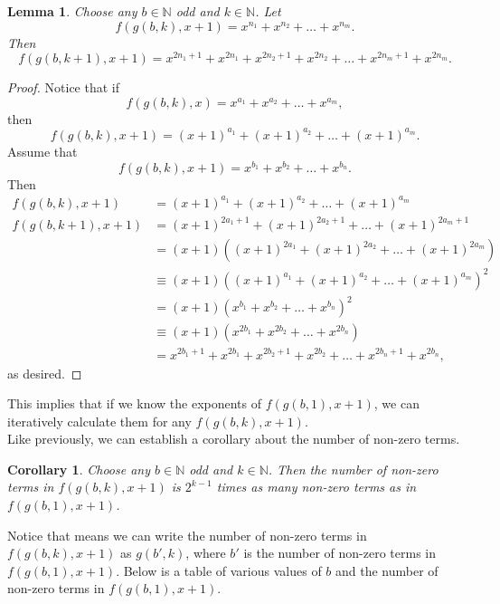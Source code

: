 \documentclass{article}
\newtheorem{lemma}{Lemma}
\newtheorem{corollary}{Corollary}
\newcommand{\N}{\mathbb{N}}
\begin{document}
	\newpage
	\begin{lemma}
		Choose any $b \in \N$ odd and $k \in \N$.
		Let
		\begin{equation*}
			f(g(b,k),x+1) = x^{n_1} + x^{n_2} + \dots + x^{n_m}.
		\end{equation*}
		Then
		\begin{equation*}
			f(g(b,k+1),x+1) = x^{2n_1 + 1} + x^{2n_1} + x^{2n_2 + 1} + x^{2n_2} + \dots + x^{2n_m + 1} + x^{2n_m}.
		\end{equation*}
	\end{lemma}
	\begin{proof}
		Notice that if
		\begin{equation*}
			f(g(b,k),x) = x^{a_1} + x^{a_2} + \dots + x^{a_m},
		\end{equation*}
		then
		\begin{equation*}
			f(g(b,k),x+1) = (x+1)^{a_1} + (x+1)^{a_2} + \dots + (x+1)^{a_m}.
		\end{equation*}
		Assume that
		\begin{equation*}
			f(g(b,k),x+1) = x^{b_1} + x^{b_2} + \dots + x^{b_n}.
		\end{equation*}
		Then
		\begin{align*}
			f(g(b,k),x+1) &= (x+1)^{a_1} + (x+1)^{a_2} + \dots + (x+1)^{a_m} \\
			f(g(b,k+1),x+1) &= (x+1)^{2a_1 + 1} + (x+1)^{2a_2 + 1} + \dots + (x+1)^{2a_m + 1} \\
			&= (x+1)\left((x+1)^{2a_1} + (x+1)^{2a_2} + \dots + (x+1)^{2a_m}\right) \\
			&\equiv (x+1)\left((x+1)^{a_1} + (x+1)^{a_2} + \dots + (x+1)^{a_m}\right)^2 \\
			&= (x+1)\left(x^{b_1} + x^{b_2} + \dots + x^{b_n}\right)^2 \\
			&\equiv (x+1)\left(x^{2b_1} + x^{2b_2} + \dots + x^{2b_n}\right) \\
			&= x^{2b_1 + 1} + x^{2b_1} + x^{2b_2 + 1} + x^{2b_2} + \dots + x^{2b_n + 1} + x^{2b_n},
		\end{align*}
		as desired.
	\end{proof}
	This implies that if we know the exponents of $f(g(b,1),x+1)$, we can iteratively calculate them for any $f(g(b,k),x+1)$. \\
	
	Like previously, we can establish a corollary about the number of non-zero terms.
	\begin{corollary}
		Choose any $b \in \N$ odd and $k \in \N$.
		Then the number of non-zero terms in $f(g(b,k),x+1)$ is $2^{k-1}$ times as many non-zero terms as in $f(g(b,1),x+1)$.
	\end{corollary}
	Notice that means we can write the number of non-zero terms in $f(g(b,k),x+1)$ as $g(b',k)$, where $b'$ is the number of non-zero terms in $f(g(b,1),x+1)$.
	Below is a table of various values of $b$ and the number of non-zero terms in $f(g(b,1),x+1)$.
	
\end{document}
